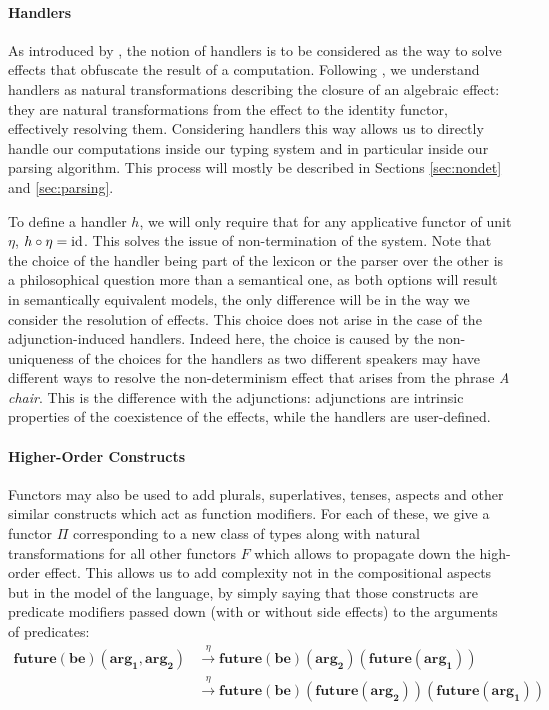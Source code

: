 \paragraph{Handlers}
\label{par:handlers}
As introduced by \cite{marsikAlgebraicEffectsHandlers}, the notion of handlers
is to be considered as the way to solve effects that obfuscate the result of a
computation.
Following \cite{wuEffectHandlersScope2014}, we understand handlers as natural
transformations describing the closure of an algebraic effect: they are natural
transformations from the effect to the identity functor, effectively resolving
them.
Considering handlers this way allows us to directly handle our computations
inside our typing system and in particular inside our parsing algorithm.
This process will mostly be described in Sections \ref{sec:nondet} and
\ref{sec:parsing}.

\smallskip

To define a handler $h$, we will only require that for any applicative functor
of unit $\eta$, $h\circ \eta = \mathrm{id}$.
This solves the issue of non-termination of the system.
Note that the choice of the handler being part of the lexicon or the parser
over the other is a philosophical question more than a semantical one, as both
options will result in semantically equivalent models, the only difference will
be in the way we consider the resolution of effects.
This choice does not arise in the case of the adjunction-induced
handlers.
Indeed here, the choice is caused by the non-uniqueness of the choices for
the handlers as two different speakers may have different ways to resolve the
non-determinism effect that arises from the phrase \textsl{A chair}.
This is the difference with the adjunctions: adjunctions are intrinsic
properties of the coexistence of the effects, while the handlers
are user-defined.

\paragraph{Higher-Order Constructs}
\label{par:higherorder}
Functors may also be used to add plurals, superlatives, tenses, aspects and
other similar constructs which act as function modifiers.
For each of these, we give a functor $\Pi$ corresponding to a new class of
types along with natural transformations for all other functors $F$ which
allows to propagate down the high-order effect.
This allows us to add complexity not in the compositional aspects but
in the model of the language, by simply saying that those constructs are
predicate modifiers passed down (with or without side effects) to the arguments
of predicates:
\begin{equation*}
	\begin{aligned}
		\mathbf{future\left( be \right)\left( arg_{1}, arg_{2} \right)}
		 & \xrightarrow{\eta} \mathbf{future\left( be \right)\left( arg_{2} \right)\left( future\left( arg_{1} \right) \right)}                           \\
		 & \xrightarrow{\eta} \mathbf{future \left( be \right) \left( future \left( arg_{2} \right) \right) \left( future \left( arg_{1} \right) \right)}
	\end{aligned}
\end{equation*}

